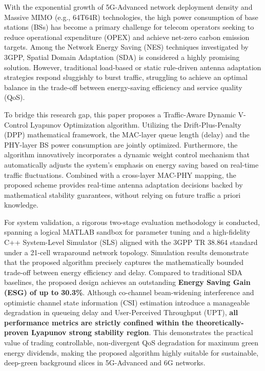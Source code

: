 \begin{abstract*}

With the exponential growth of 5G-Advanced network deployment density and Massive MIMO (e.g., 64T64R) technologies, the high power consumption of base stations (BSs) has become a primary challenge for telecom operators seeking to reduce operational expenditure (OPEX) and achieve net-zero carbon emission targets. Among the Network Energy Saving (NES) techniques investigated by 3GPP, Spatial Domain Adaptation (SDA) is considered a highly promising solution. However, traditional load-based or static rule-driven antenna adaptation strategies respond sluggishly to burst traffic, struggling to achieve an optimal balance in the trade-off between energy-saving efficiency and service quality (QoS). 

To bridge this research gap, this paper proposes a Traffic-Aware Dynamic V-Control Lyapunov Optimization algorithm. Utilizing the Drift-Plus-Penalty (DPP) mathematical framework, the MAC-layer queue length (delay) and the PHY-layer BS power consumption are jointly optimized. Furthermore, the algorithm innovatively incorporates a dynamic weight control mechanism that automatically adjusts the system's emphasis on energy saving based on real-time traffic fluctuations. Combined with a cross-layer MAC-PHY mapping, the proposed scheme provides real-time antenna adaptation decisions backed by mathematical stability guarantees, without relying on future traffic a priori knowledge. 

For system validation, a rigorous two-stage evaluation methodology is conducted, spanning a logical MATLAB sandbox for parameter tuning and a high-fidelity C++ System-Level Simulator (SLS) aligned with the 3GPP TR 38.864 standard under a 21-cell wraparound network topology. Simulation results demonstrate that the proposed algorithm precisely captures the mathematically bounded trade-off between energy efficiency and delay. Compared to traditional SDA baselines, the proposed design achieves an outstanding \textbf{Energy Saving Gain (ESG) of up to 30.3\%}. Although co-channel beam-widening interference and optimistic channel state information (CSI) estimation introduce a manageable degradation in queueing delay and User-Perceived Throughput (UPT), \textbf{all performance metrics are strictly confined within the theoretically-proven Lyapunov strong stability region}. This demonstrates the practical value of trading controllable, non-divergent QoS degradation for maximum green energy dividends, making the proposed algorithm highly suitable for sustainable, deep-green background slices in 5G-Advanced and 6G networks.

\end{abstract*}